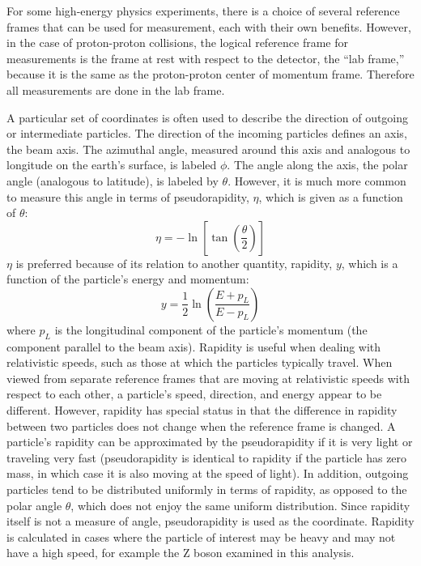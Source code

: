 
For some high-energy physics experiments, 
there is a choice of several reference 
frames that can be used for measurement, 
each with their own benefits.  
However, in the case of proton-proton collisions, 
the logical reference frame for measurements is 
the frame at rest with respect to the detector, 
the ``lab frame,'' 
because it is the same as the 
proton-proton center of momentum frame.  
Therefore all measurements are done 
in the lab frame.  


A particular set of coordinates is often used to describe 
the direction of outgoing or intermediate particles.  
The direction of the incoming particles defines an axis, 
the beam axis.  
The azimuthal angle, measured around this axis 
and analogous to longitude on the earth's surface, 
is labeled $\phi$.  
The angle along the axis, the polar angle 
(analogous to latitude), 
is labeled by $\theta$.  
However, it is much more common to measure this 
angle in terms of pseudorapidity, $\eta$, 
which is given as a function of $\theta$:
\[
\eta = -\ln \left[ \tan \left( \frac{\theta}{2}\right) \right]
\]
$\eta$ is preferred because of its relation to another quantity, 
rapidity, $y$, which is a function of the particle's 
energy and momentum:
\[
y = \frac{1}{2} \ln \left( \frac{E+p_L}{E-p_L} \right)
\]
where $p_L$ is the longitudinal component of the 
particle's momentum (the component parallel to the beam axis).  
Rapidity is useful when dealing with relativistic speeds, 
such as those at which the particles typically travel.  
When viewed from separate reference frames that are moving 
at relativistic speeds with respect to each other, 
a particle's speed, direction, and energy appear to be different.  
However, rapidity has special status in that the 
difference in rapidity 
between two particles does not change 
when the reference frame is changed.  
A particle's rapidity can be approximated by the 
pseudorapidity if it is very light or 
traveling very fast 
(pseudorapidity is identical to rapidity 
if the particle has zero mass, 
in which case it is also 
moving at the speed of light).  
In addition, outgoing particles tend to be 
distributed uniformly in terms of rapidity, 
as opposed to the polar angle $\theta$, 
which does not enjoy the same uniform distribution. 
Since rapidity itself is not a measure of angle, 
pseudorapidity is used as the coordinate.  
Rapidity is calculated in cases 
where the particle of interest may be heavy 
and may not have a high speed, 
for example the Z boson examined in this analysis.  

